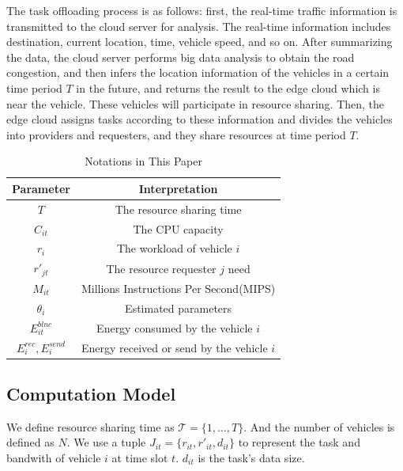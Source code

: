 \documentclass[conference]{IEEEtran}
\begin{document}
	The task offloading process is as follows: first, the real-time traffic information is transmitted to the cloud server for analysis. The real-time information includes destination, current location, time, vehicle speed, and so on. After summarizing the data, the cloud server performs big data analysis to obtain the road congestion, and then infers the location information of the vehicles in a certain time period $T$ in the future, and returns the result to the edge cloud which is near the vehicle. 
	These vehicles will participate in resource sharing.
	Then, the edge cloud assigns tasks according to these information and divides the vehicles into providers and requesters, and they share resources at time period $T$.


\begin{table}[]
	\centering
	\caption{Notations in This Paper}
	\begin{tabular}{|c|c|}
		\hline
		Parameter    &    Interpretation\\
		\hline
		
		$T$	          & The resource sharing time   \\
		$C_{it}$      &   The CPU capacity    \\
		$r_i $   &   The workload of vehicle $i$ \\
		$r'_{jt} $ 	  &   The resource requester $j$ need    \\
		$M_{it}$      &   Millions Instructions Per Second(MIPS)   \\
		$\theta _i   $      &  Estimated parameters   \\
		
		$E^{blnc}_{it}$   &   Energy consumed by the vehicle $i$  \\
		
		$E^{rec}_i, E^{send}_i$ & Energy received or send by the vehicle $i$  \\
		
		
		\hline
	\end{tabular}
\end{table}

\subsection{Computation Model}
We define resource sharing time as $ \mathcal{T}=\{1, \ldots, T \}$. 
And the number of vehicles is defined as $N$. 
We use a tuple $J_{it} = \{r_ {it}, r'_ {it}, d_{it}\}$ to represent the task and bandwith of vehicle $i$ at time slot $t$. $d_{it}$ is the task's data size.
\end{document}
